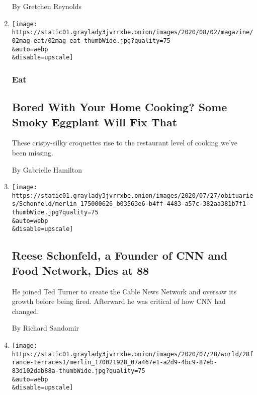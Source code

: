 \begin{enumerate}
  By Gretchen Reynolds
\item
  \href{/2020/07/29/magazine/bored-with-your-home-cooking-some-smoky-eggplant-will-fix-that.html}{}

  \texttt{[image: https://static01.graylady3jvrrxbe.onion/images/2020/08/02/magazine/02mag-eat/02mag-eat-thumbWide.jpg?quality=75\\\&auto=webp\\\&disable=upscale]}

  \hypertarget{eat-}{%
  \subsubsection{Eat }\label{eat-}}

  \hypertarget{bored-with-your-home-cooking-some-smoky-eggplant-will-fix-that}{%
  \subsection{Bored With Your Home Cooking? Some Smoky Eggplant Will Fix
  That}\label{bored-with-your-home-cooking-some-smoky-eggplant-will-fix-that}}

  These crispy-silky croquettes rise to the restaurant level of cooking
  we've been missing.

  By Gabrielle Hamilton
\item
  \href{/2020/07/28/business/media/reese-schonfeld-a-founder-of-cnn-and-food-network-dies-at-88.html}{}

  \texttt{[image: https://static01.graylady3jvrrxbe.onion/images/2020/07/27/obituaries/Schonfeld/merlin\_175000626\_b03563e6-b4ff-4483-a57c-382aa381b7f1-thumbWide.jpg?quality=75\\\&auto=webp\\\&disable=upscale]}

  \hypertarget{reese-schonfeld-a-founder-of-cnn-and-food-network-dies-at-88}{%
  \subsection{Reese Schonfeld, a Founder of CNN and Food Network, Dies
  at
  88}\label{reese-schonfeld-a-founder-of-cnn-and-food-network-dies-at-88}}

  He joined Ted Turner to create the Cable News Network and oversaw its
  growth before being fired. Afterward he was critical of how CNN had
  changed.

  By Richard Sandomir
\item
  \href{/2020/07/28/world/europe/france-heated-terraces-coronavirus.html}{}

  \texttt{[image: https://static01.graylady3jvrrxbe.onion/images/2020/07/28/world/28france-terraces1/merlin\_170021928\_07a467e1-a2d9-4bc9-87eb-83d102dab88a-thumbWide.jpg?quality=75\\\&auto=webp\\\&disable=upscale]}


\end{enumerate}
